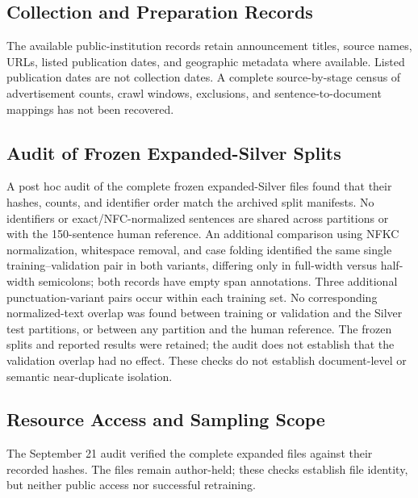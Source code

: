 \subsection{Collection and Preparation Records}
The available public-institution records retain announcement titles, source names, URLs, listed publication dates, and geographic metadata where available. Listed publication dates are not collection dates. A complete source-by-stage census of advertisement counts, crawl windows, exclusions, and sentence-to-document mappings has not been recovered.

\subsection{Audit of Frozen Expanded-Silver Splits}
A post hoc audit of the complete frozen expanded-Silver files found that their hashes, counts, and identifier order match the archived split manifests. No identifiers or exact/NFC-normalized sentences are shared across partitions or with the 150-sentence human reference. An additional comparison using NFKC normalization, whitespace removal, and case folding identified the same single training--validation pair in both variants, differing only in full-width versus half-width semicolons; both records have empty span annotations. Three additional punctuation-variant pairs occur within each training set. No corresponding normalized-text overlap was found between training or validation and the Silver test partitions, or between any partition and the human reference. The frozen splits and reported results were retained; the audit does not establish that the validation overlap had no effect. These checks do not establish document-level or semantic near-duplicate isolation.

\subsection{Resource Access and Sampling Scope}
\label{sec:resource-access}

The September 21 audit verified the complete expanded files against their recorded hashes. The files remain author-held; these checks establish file identity, but neither public access nor successful retraining.


